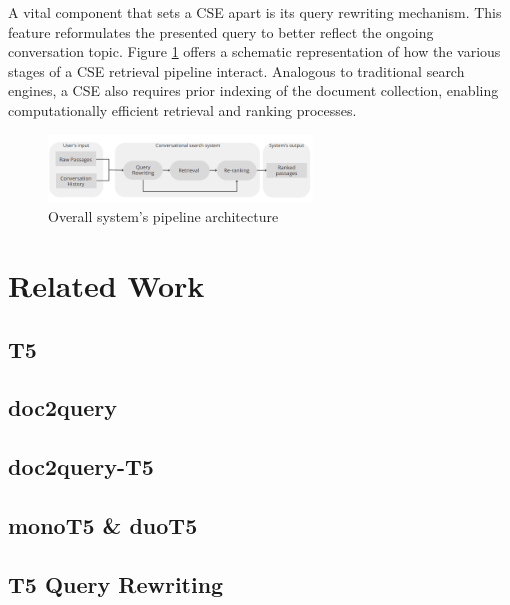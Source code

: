 \documentclass[sigconf]{acmart}
\begin{document}
A vital component that sets a CSE apart is its query rewriting mechanism. This feature reformulates the presented query to better reflect the ongoing conversation topic. Figure \ref{figure:global_pipeline} offers a schematic representation of how the various stages of a CSE retrieval pipeline interact. Analogous to traditional search engines, a CSE also requires prior indexing of the document collection, enabling computationally efficient retrieval and ranking processes.

\begin{figure}[h]
	\includegraphics[width=7cm]{pipeline.png}
	\caption{Overall system's pipeline architecture}
	\label{figure:global_pipeline}
\end{figure}


\section{Related Work}\label{sec:related}
\subsection*{T5}

\subsection*{doc2query}

\subsection*{doc2query-T5}

\subsection*{monoT5 \& duoT5}

\subsection*{T5 Query Rewriting}
\end{document}
